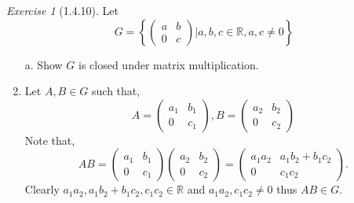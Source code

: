 \documentclass[12pt]{amsart}
\makeatletter
\theoremstyle{remark}
\newtheorem*{exercise}{Exercise}%
\def\RR{\ensuremath{\mathbb R}} %
\renewenvironment{proof}[1][\proofname]{\par\doublespacing
  \pushQED{\qed}%
  \normalfont \topsep6\p@\@plus6\p@\relax
  \list{}{%
    \settowidth{\leftmargin}{\itshape\proofname:\hskip\labelsep}%
    \setlength{\labelwidth}{0pt}%
    \setlength{\itemindent}{-\leftmargin}%
  }%
  \item[\hskip\labelsep\itshape#1\@addpunct{:}]\ignorespaces
}{%
  \popQED\endlist\@endpefalse
  \singlespacing
}
\theoremstyle{mycomment}
\makeatother
\begin{document}
\begin{exercise}[1.4.10] Let 
  \begin{equation*}
    G = \left\{\begin{pmatrix}
      a & b\\
      0 & c
    \end{pmatrix}| a,b,c \in \RR, a,c \neq 0\right\}  
  \end{equation*}

  \begin{enumerate}
    \item[a.] Show $G$ is closed under matrix multiplication. 
    \begin{proof} Let $A, B \in G$ such that, 
      \begin{equation*}
        A = \begin{pmatrix}
          a_1 & b_1\\
          0 & c_1
        \end{pmatrix}
        , 
        B = \begin{pmatrix}
          a_2 & b_2\\
          0 & c_2
        \end{pmatrix}
      \end{equation*}
      Note that, 
      \begin{equation*}
        AB = \begin{pmatrix}
          a_1 & b_1\\
          0 & c_1
        \end{pmatrix}
      \begin{pmatrix}
          a_2 & b_2\\
          0 & c_2
        \end{pmatrix} = 
        \begin{pmatrix}a_1a_2&a_1b_2+b_1c_2\\ 0&c_1c_2\end{pmatrix}.
      \end{equation*}
      Clearly $a_1a_2, a_1b_2+b_1c_2, c_1c_2 \in \RR$ and $a_1a_2, c_1c_2 \neq 0$ thus $AB \in G$.
    \end{proof}


\end{enumerate}
\end{exercise}
\end{document}
